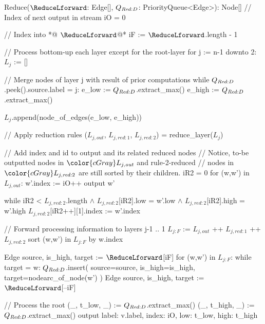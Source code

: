 \begin{blstlisting}
  Reduce($\ReduceLforward$: Edge[], $\ReduceQdep$: PriorityQueue<Edge>): Node[]
    // Index of next output in stream
    iO = 0

    // Index into *@\color{cGray} $\ReduceLforward$@*
    iF := $\ReduceLforward$.length - 1

    // Process bottom-up each layer except for the root-layer
    for j := n-1 downto 2:
      $L_{j}$ := []

      // Merge nodes of layer j with result of prior computations
      while $\ReduceQdep$.peek().source.label = j:
        e_low  := $\ReduceQdep$.extract_max()
        e_high := $\ReduceQdep$.extract_max()

        $L_{j}$.append(node_of_edges(e_low, e_high))

      // Apply reduction rules
      ($L_{j,\mathit{out}}$, $L_{j,\mathit{red:}1}$, $L_{j,\mathit{red:}2}$) = reduce_layer($L_{j}$)

      // Add index and id to output and its related reduced nodes
      //   Notice, to-be outputted nodes in $\color{cGray}L_{j,\mathit{out}}$ and rule-2-reduced
      //   nodes in $\color{cGray}L_{j,\mathit{red:}2}$ are still sorted by their children.
      iR2 = 0
      for (w,w') in $L_{j,\mathit{out}}$:
        w'.index := iO++
        output w'

        while iR2 < $L_{j,\mathit{red:}2}$.length $\land$ $L_{j,\mathit{red:}2}$[iR2].low = w'.low
                                 $\land$ $L_{j,\mathit{red:}2}$[iR2].high = w'.high
          $L_{j,\mathit{red:}2}$[iR2++][1].index := w'.index

      // Forward processing information to layers j-1 .. 1
      $L_{j:F}$ := $L_{j,\mathit{out}}$ ++ $L_{j,\mathit{red:}1}$ ++ $L_{j,\mathit{red:}2}$
      sort (w,w') in $L_{j:F}$ by w.index

      Edge{ source, is_high, target } := $\ReduceLforward$[iF]
      for (w,w') in $L_{j:F}$:
        while target = w:
          $\ReduceQdep$.insert({
            source=source,
            is_high=is_high,
            target=nodearc_of_node(w')
          })
          Edge{ source, is_high, target } := $\ReduceLforward$[--iF]

    // Process the root
    (_, t_low,  _) := $\ReduceQdep$.extract_max()
    (_, t_high, _) := $\ReduceQdep$.extract_max()
    output { label: v.label, index: iO, low: t_low, high: t_high }
\end{blstlisting}
